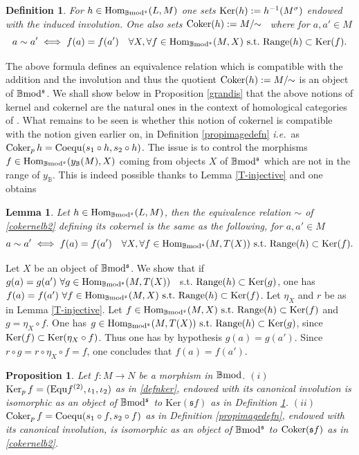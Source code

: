\documentclass[12pt]{article}
\newtheorem{prop}[thm]{Proposition}
\newtheorem{lem}[thm]{Lemma}
\newtheorem{defn}[thm]{Definition}
\def\Hom{{\rm Hom}}
\def\Ker{{\rm Ker}}
\def\Kpr{{\rm Ker}_p\,}
\def\Cpr{{\rm Coker}_p\,}
\def\equ{{\rm Equ}}
\def\coker{{\rm Coker}}
\def\coequ{{\rm Coequ}}
\def\B{{\mathbb B}}
\newcommand{\ie}{{\it i.e.\/}\ }
\def\ker{{\mbox{Ker}}}
\def\Hom {{\mbox{Hom}}}
\def\yb{\mathfrak{s}}
\def\bmod{{\rm \B mod}}
\def\b2{{\rm \B mod^{\mathfrak s}}}
\begin{document}
 \begin{defn}\label{ker&coker} For $h\in \Hom_\b2(L,M)$  one sets
 $	\Ker(h):=h^{-1} (M^\sigma) $ 
endowed with the induced involution.  One also sets $\coker(h):=M/\!\!\sim$ ~where for $a,a'\in M$
 \begin{equation}\label{cokernelb2}
 a\sim a'\iff f(a)=f(a')~\ ~ \forall X, \forall f\in \Hom_\b2(M,X)~{\rm s.t.}~ {\rm Range}(h)\subset \Ker(f).
\end{equation}
\end{defn}
The above formula defines an equivalence relation which is compatible with the addition and the  involution and thus the quotient $\coker(h):=M/\!\!\sim$ is an object of $\b2$. We shall show below in Proposition \ref{grandis} that the above notions of kernel and cokernel are the natural ones in the context of homological categories of \cite{gra}. What remains to be seen is whether this notion of cokernel is compatible with the notion given earlier on, in Definition \ref{propimagedefn} \ie as $\Cpr h = \coequ (s_1\circ h,s_2\circ h)$. The issue is to control the morphisms $f\in \Hom_\b2(y_\B(M),X)$ coming from objects $X$ of $\b2$ which are not in the range of $y_\B$. This is indeed possible thanks to Lemma \ref{T-injective} and one obtains 
 \begin{lem}\label{T-injectiveused} Let $h\in \Hom_\b2(L,M)$, then the equivalence relation $\sim$ of \eqref{cokernelb2} defining its cokernel is the same as the following, for $a,a'\in M$
 \begin{equation}\label{cokernelb2bis}
 a\sim a'\iff f(a)=f(a')~\ ~ \forall X, \forall f\in \Hom_\b2(M,T(X))~{\rm s.t.}~ {\rm Range}(h)\subset \Ker(f).
\end{equation}
 \end{lem}
 \proof Let $X$ be an object of $\b2$. We show that if $g(a)=g(a')\ \forall g\in \Hom_\b2(M,T(X))$~ s.t. ${\rm Range}(h)\subset \Ker(g)$, one has $f(a)=f(a')\ \forall f\in \Hom_\b2(M,X)~{\rm s.t.}~ {\rm Range}(h)\subset \Ker(f)$. Let $\eta_X$  and $r$ be as in Lemma \ref{T-injective}. Let $f\in \Hom_\b2(M,X)~{\rm s.t.}~ {\rm Range}(h)\subset \Ker(f)$ and $g=\eta_X\circ f$. One has $g\in \Hom_\b2(M,T(X))~{\rm s.t.}~ {\rm Range}(h)\subset \Ker(g)$, since $\Ker(f)\subset \Ker(\eta_X\circ f)$. Thus one has by hypothesis $g(a)=g(a')$. Since $r\circ g=r\circ\eta_X\circ f=f$, one concludes that $f(a)=f(a')$. \endproof  
 \begin{prop}\label{cokernelequiv} Let $f:M\to N$ be a morphism in $\bmod$.\newline
 $(i)$~$\Kpr f=(\equ f^{(2)},\iota_1,\iota_2)$  as in \eqref{defnker}, endowed with its canonical involution is  isomorphic as an object of $\b2$ to $\ker(\yb f)$ as in  Definition \ref{ker&coker}.\newline
 $(ii)$~$
\Cpr f = \coequ (s_1\circ f,s_2\circ f)$ as in Definition \ref{propimagedefn}, endowed with its canonical involution, is isomorphic as an object of $\b2$ to $\coker(\yb f)$ as in  \eqref{cokernelb2}. 
 \end{prop}
\end{document}
